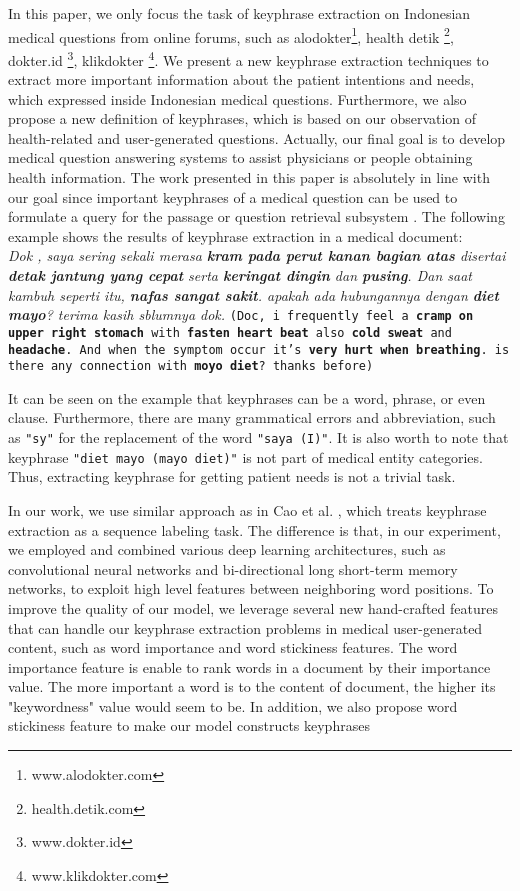 \documentclass[sigconf]{acmart}
\begin{document}
In this paper, we only focus the task of keyphrase extraction on Indonesian medical questions from online forums, such as alodokter\footnote{www.alodokter.com}, health detik \footnote{health.detik.com}, dokter.id \footnote{www.dokter.id}, klikdokter \footnote{www.klikdokter.com}. We present a new keyphrase extraction techniques to extract more important information about the patient intentions and needs, which expressed inside Indonesian medical questions. Furthermore, we also propose a new definition of keyphrases, which is based on our observation of health-related and user-generated questions. Actually, our final goal is to develop medical question answering systems to assist physicians or people obtaining health information. The work presented in this paper is absolutely in line with our goal since important keyphrases of a medical question can be used to formulate a query for the passage or question retrieval subsystem \cite{gong2009improving}. The following example shows the results of keyphrase extraction in a medical document:
	\textit{\\Dok , saya sering sekali merasa \textbf{\emph{kram pada perut kanan bagian atas}} disertai \textbf{detak jantung yang cepat} serta \textbf{keringat dingin} dan \textbf{pusing}. Dan saat kambuh seperti itu, \textbf{nafas sangat sakit}. apakah ada hubungannya dengan \textbf{diet mayo}? terima kasih sblumnya dok.}
	\texttt{(Doc, i frequently feel a \textbf{cramp on upper right stomach} with \textbf{fasten heart beat} also \textbf{cold sweat} and \textbf{headache}. And when the symptom occur it's \textbf{very hurt when breathing}. is there any connection with \textbf{moyo diet}? thanks before)}
	
It can be seen on the example that keyphrases can be a word, phrase, or even clause. Furthermore, there are many grammatical errors and abbreviation, such as \texttt{"sy"} for the replacement of the word \texttt{"saya (I)"}. It is also worth to note that keyphrase \texttt{"diet mayo (mayo diet)"} is not part of medical entity categories. Thus, extracting keyphrase for getting patient needs is not a trivial task. 

In our work, we use similar approach as in Cao et al. \cite{cao2010automatically}, which treats keyphrase extraction as a sequence labeling task. The difference is that, in our experiment, we employed and combined various deep learning architectures, such as convolutional neural networks and bi-directional long short-term memory networks, to exploit high level features between neighboring word positions. To improve the quality of our model, we leverage several new hand-crafted features that can handle our keyphrase extraction problems in medical user-generated content, such as word importance and word stickiness features. The word importance feature is enable to rank words in a document by their importance value. The more important a word is to the content of document, the higher its "keywordness" value would seem to be. In addition, we also propose word stickiness feature to make our model constructs keyphrases
\end{document}
